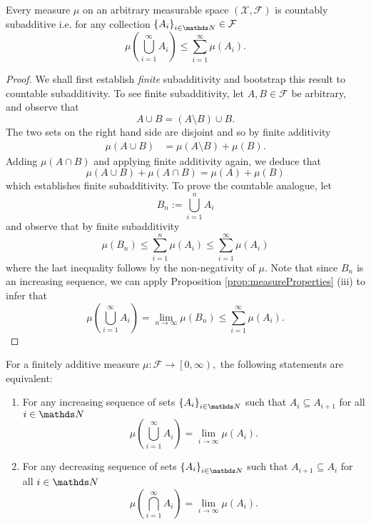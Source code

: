 \begin{cor}
\label{cor:countableSubadditivity}Every measure $\mu$ on an arbitrary
measurable space $\left(\mathcal{X},\mathcal{F}\right)$ is countably
subadditive i.e. for any collection $\left\{ A_{i}\right\} _{i\in\N}\in\mathcal{F}$
\[
\mu\left(\bigcup_{i=1}^{\infty}A_{i}\right)\leq\sum_{i=1}^{\infty}\mu\left(A_{i}\right).
\]
\end{cor}

\begin{proof}
We shall first establish \emph{finite }subadditivity and bootstrap
this result to countable subadditivity. To see finite subadditivity,
let $A,B\in\mathcal{F}$ be arbitrary, and observe that
\[
A\cup B=\left(A\setminus B\right)\cup B.
\]
The two sets on the right hand side are disjoint and so by finite
additivity
\begin{align*}
\mu\left(A\cup B\right) & =\mu\left(A\setminus B\right)+\mu\left(B\right).
\end{align*}
Adding $\mu\left(A\cap B\right)$ and applying finite additivity again,
we deduce that
\[
\mu\left(A\cup B\right)+\mu\left(A\cap B\right)=\mu\left(A\right)+\mu\left(B\right)
\]
which establishes finite subadditivity. To prove the countable analogue,
let
\[
B_{n}:=\bigcup_{i=1}^{n}A_{i}
\]
and observe that by finite subadditivity
\[
\mu\left(B_{n}\right)\leq\sum_{i=1}^{n}\mu\left(A_{i}\right)\leq\sum_{i=1}^{\infty}\mu\left(A_{i}\right)
\]
where the last inequality follows by the non-negativity of $\mu.$
Note that since $B_{n}$ is an increasing sequence, we can apply Proposition
\ref{prop:measureProperties} (iii) to infer that
\[
\mu\left(\bigcup_{i=1}^{\infty}A_{i}\right)=\lim_{n\to\infty}\mu\left(B_{n}\right)\leq\sum_{i=1}^{\infty}\mu\left(A_{i}\right).
\]
\end{proof}
\begin{prop}
\label{prop:equivalenceContinuityMeasures}For a finitely additive
measure $\mu:\mathcal{F}\longrightarrow\left[0,\infty\right),$ the
following statements are equivalent:

\begin{enumerate}[label=(\roman*),leftmargin=.1\linewidth,rightmargin=.4\linewidth]
	\item For any increasing sequence of sets $\left\{ A_{i}\right\} _{i\in\N}$ such that $A_i \subseteq A_{i+1}$ for all $i\in \N$
	\[
					\mu\left(\bigcup_{i=1}^{\infty} A_i\right) = \lim_{i\to\infty}\mu\left(A_i\right).
	\]
	\item For any decreasing sequence of sets $\left\{ A_{i}\right\} _{i\in\N}$ such that $ A_{i+1}\subseteq A_i$ for all $i\in \N$ 
	\[
					\mu\left(\bigcap_{i=1}^{\infty} A_i\right) = \lim_{i\to\infty}\mu\left(A_i\right).
	\]
\end{enumerate}
\end{prop}

